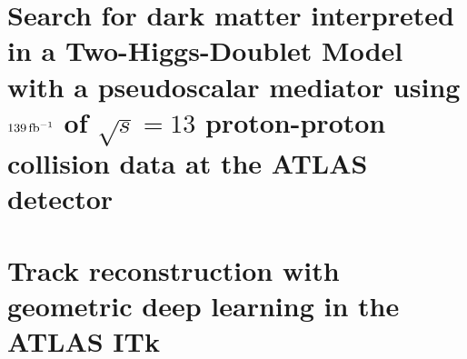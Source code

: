 \documentclass[12pt]{withesis}
\begin{document}

% 
\setcounter{page}{0}
% 
% 
% 

\tableofcontents
\cleardoublepage
{} %
\listoffigures
\cleardoublepage
{} %
\listoftables


\setlength{\parskip}{1em}


\part{Search for dark matter interpreted in a Two-Higgs-Doublet Model with a pseudoscalar mediator using $139\, \mbox{fb\(^{-1}\)}$ of $\sqrt{s}=13$ \TeV proton-proton collision data at the ATLAS detector}





\part{Track reconstruction with geometric deep learning in the ATLAS ITk}



% 



% 
% 

% 
% 


% 
% 
% 
% 




% 
\end{document}

